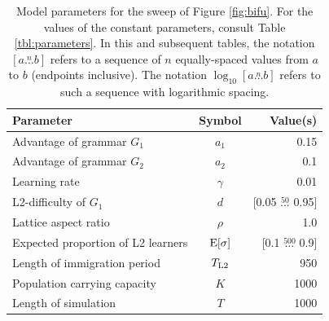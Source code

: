\begin{table}\caption{Model parameters for the sweep of Figure \ref{fig:bifu}. For the values of the constant parameters, consult Table \ref{tbl:parameters}. In this and subsequent tables, the notation $[a \stackrel{n}{\dots} b]$ refers to a sequence of $n$ equally-spaced values from $a$ to $b$ (endpoints inclusive). The notation $\log_{10}[a \stackrel{n}{\dots} b]$ refers to such a sequence with logarithmic spacing.}\label{tbl:bifu}\begin{tabular}{lcr}
\toprule
Parameter & Symbol & Value(s) \\
\midrule
Advantage of grammar $G_1$ & $a_1$ & 0.15 \\
Advantage of grammar $G_2$ & $a_2$ & 0.1 \\
Learning rate & $\gamma$ & 0.01 \\
L2-difficulty of $G_1$ & $d$ & [0.05 $\stackrel{50}{\ldots}$ 0.95] \\
Lattice aspect ratio & $\rho$ & 1.0 \\
Expected proportion of L2 learners & $\textnormal{E}[\sigma]$ & [0.1 $\stackrel{500}{\ldots}$ 0.9] \\
Length of immigration period & $T_\textnormal{L2}$ & 950 \\
Population carrying capacity & $K$ & 1000 \\
Length of simulation & $T$ & 1000 \\
\bottomrule
\end{tabular}
\end{table}
